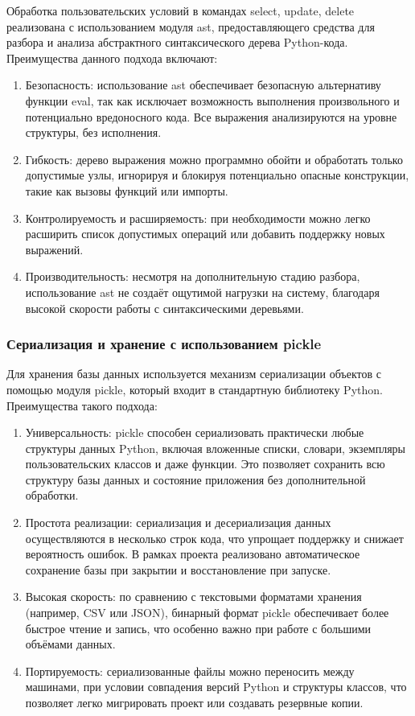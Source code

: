 Обработка пользовательских условий в командах select, update, delete реализована с использованием модуля ast, предоставляющего средства для разбора и анализа абстрактного синтаксического дерева Python-кода. Преимущества данного подхода включают:
\begin{enumerate}
	\item Безопасность: использование ast обеспечивает безопасную альтернативу функции eval, так как исключает возможность выполнения произвольного и потенциально вредоносного кода. Все выражения анализируются на уровне структуры, без исполнения.
	\item Гибкость: дерево выражения можно программно обойти и обработать только допустимые узлы, игнорируя и блокируя потенциально опасные конструкции, такие как вызовы функций или импорты.
	\item Контролируемость и расширяемость: при необходимости можно легко расширить список допустимых операций или добавить поддержку новых выражений. 
	\item Производительность: несмотря на дополнительную стадию разбора, использование ast не создаёт ощутимой нагрузки на систему, благодаря высокой скорости работы с синтаксическими деревьями.
\end{enumerate}

\subsubsection{Сериализация и хранение с использованием pickle}

Для хранения базы данных используется механизм сериализации объектов с помощью модуля pickle, который входит в стандартную библиотеку Python. Преимущества такого подхода:
\begin{enumerate}
	\item Универсальность: pickle способен сериализовать практически любые структуры данных Python, включая вложенные списки, словари, экземпляры пользовательских классов и даже функции. Это позволяет сохранить всю структуру базы данных и состояние приложения без дополнительной обработки.
	\item Простота реализации: сериализация и десериализация данных осуществляются в несколько строк кода, что упрощает поддержку и снижает вероятность ошибок. В рамках проекта реализовано автоматическое сохранение базы при закрытии и восстановление при запуске.
	\item Высокая скорость: по сравнению с текстовыми форматами хранения (например, CSV или JSON), бинарный формат pickle обеспечивает более быстрое чтение и запись, что особенно важно при работе с большими объёмами данных.
	\item Портируемость: сериализованные файлы можно переносить между машинами, при условии совпадения версий Python и структуры классов, что позволяет легко мигрировать проект или создавать резервные копии.
\end{enumerate}

